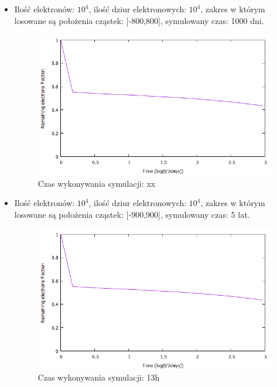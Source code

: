\begin{itemize}

\item Ilość elektronów: $10^{4}$, ilość dziur elektronowych: $10^{4}$, zakres w którym losowane są położenia cząstek: [-800,800], symulowany czas: 1000 dni.
\begin{figure}[H]
\centering
\includegraphics[width=17cm]{wykres2}
\caption{ Czas wykonywania symulacji: xx}
\label{fig:Tunelowanie}
\end{figure}

\item Ilość elektronów: $10^{4}$, ilość dziur elektronowych: $10^{4}$, zakres w którym losowane są położenia cząstek: [-900,900], symulowany czas: 5 lat.
\begin{figure}[H]
\centering
\includegraphics[width=17cm]{wykres2}
\caption{ Czas wykonywania symulacji: 13h}
\label{fig:Tunelowanie}
\end{figure}


\end{itemize}
